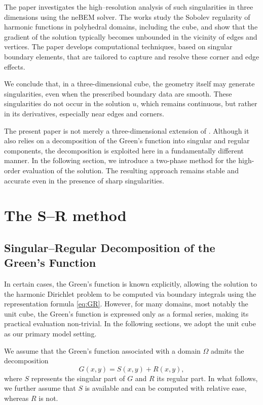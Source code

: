 \documentclass[12pt,oneside,reqno]{amsart}%
\theoremstyle{plain}
\numberwithin{equation}{section}
\begin{document}
The paper \cite{Mukh} investigates the high--resolution analysis
of such singularities in three dimensions using the neBEM solver.
The works \cite{Bacu,Cost} study the Sobolev regularity
of harmonic functions in polyhedral domains,
including the cube,
and show that the gradient of the solution typically becomes unbounded
in the vicinity of edges and vertices.
The paper \cite{Ong} develops computational techniques,
based on singular boundary elements,
that are tailored to capture and resolve these corner and edge effects.

We conclude that, in a three-dimensional cube,
the geometry itself may generate singularities,
even when the prescribed boundary data are smooth.
These singularities do not occur in the solution $u$,
which remains continuous,
but rather in its derivatives,
especially near edges and corners.

The present paper is not merely a three-dimensional extension 
of \cite{Levin1980}. 
Although it also relies on a decomposition of the Green’s function 
into singular and regular components, the decomposition is 
exploited here in a fundamentally different manner. 
In the following section, we introduce a two-phase method 
for the high-order evaluation of the solution. 
The resulting approach remains stable and accurate 
even in the presence of sharp singularities.

\section{The S--R method}

\subsection{Singular–Regular Decomposition of the Green’s Function}\hfill

In certain cases, the Green's function is known explicitly, 
allowing the solution to the harmonic Dirichlet problem 
to be computed via boundary integrals using the 
representation formula \eqref{eq:GR}. 
However, for many domains, most notably the unit cube, 
the Green's function is expressed only as a formal series, 
making its practical evaluation non-trivial. 
In the following sections, we adopt the unit cube 
as our primary model setting.

We assume that the Green's function associated with a domain $\Omega$
admits the decomposition
\begin{equation}\label{Dec}
G(x,y)=S(x,y)+R(x,y),
\end{equation}
where $S$ represents the singular part of $G$
and $R$ its regular part.
In what follows, we further assume that $S$ is available
and can be computed with relative ease,
whereas $R$ is not.
\end{document}
